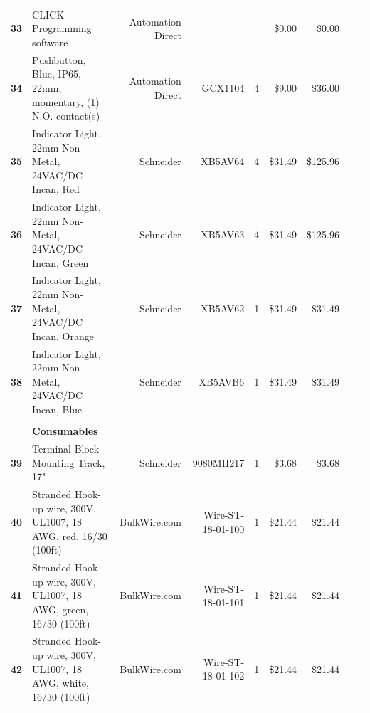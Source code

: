 \begin{table}[!htp]
{\begin{tabular}{llrrrrrrr}
      \textbf{33}    & CLICK Programming software                                                       & Automation Direct &                   &          & \$0.00   & \$0.00         \\
      \textbf{34}    & Pushbutton, Blue, IP65, 22mm, momentary, (1) N.O. contact(s)                     & Automation Direct & GCX1104           & 4        & \$9.00   & \$36.00        \\
      \textbf{35}    & Indicator Light, 22mm Non-Metal, 24VAC/DC Incan, Red                             & Schneider         & XB5AV64           & 4        & \$31.49  & \$125.96       \\
      \textbf{36}    & Indicator Light, 22mm Non-Metal, 24VAC/DC Incan, Green                           & Schneider         & XB5AV63           & 4        & \$31.49  & \$125.96       \\
      \textbf{37}    & Indicator Light, 22mm Non-Metal, 24VAC/DC Incan, Orange                          & Schneider         & XB5AV62           & 1        & \$31.49  & \$31.49        \\
      \textbf{38}    & Indicator Light, 22mm Non-Metal, 24VAC/DC Incan, Blue                            & Schneider         & XB5AVB6           & 1        & \$31.49  & \$31.49        \\
      \textbf{}      & \textbf{}                                                                        &                   &                   &          &          &                \\
      \textbf{}      & \textbf{Consumables}                                                             &                   &                   &          &          &                \\
      \textbf{39}    & Terminal Block Mounting Track, 17"                                               & Schneider         & 9080MH217         & 1        & \$3.68   & \$3.68         \\
      \textbf{40}    & Stranded Hook-up wire, 300V, UL1007, 18 AWG, red, 16/30 (100ft)                  & BulkWire.com      & Wire-ST-18-01-100 & 1        & \$21.44  & \$21.44        \\
      \textbf{41}    & Stranded Hook-up wire, 300V, UL1007, 18 AWG, green, 16/30 (100ft)                & BulkWire.com      & Wire-ST-18-01-101 & 1        & \$21.44  & \$21.44        \\
      \textbf{42}    & Stranded Hook-up wire, 300V, UL1007, 18 AWG, white, 16/30 (100ft)                & BulkWire.com      & Wire-ST-18-01-102 & 1        & \$21.44  & \$21.44        \\

\end{tabular}}
\end{table}
